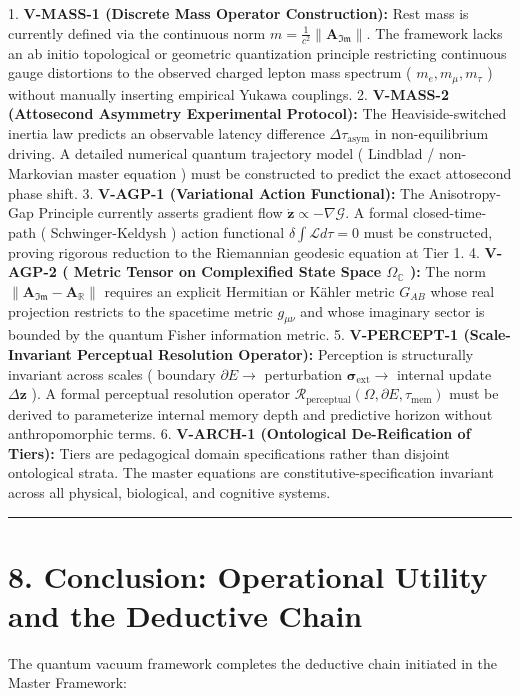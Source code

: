 \documentclass[11pt,a4paper]{article}
\theoremstyle{definition}\newtheorem{definition}{Definition}
\theoremstyle{remark}\newtheorem{remark}{Remark}
\begin{document}
1. \textbf{V-MASS-1 (Discrete Mass Operator Construction):} Rest mass is currently defined via the continuous norm $m = \frac{1}{c^2} \|\mathbf{A}_{\mathfrak{Im}}\|$. The framework lacks an ab initio topological or geometric quantization principle restricting continuous gauge distortions to the observed charged lepton mass spectrum ( $m_e, m_\mu, m_\tau$ ) without manually inserting empirical Yukawa couplings.
2. \textbf{V-MASS-2 (Attosecond Asymmetry Experimental Protocol):} The Heaviside-switched inertia law predicts an observable latency difference $\Delta \tau_{\text{asym}}$ in non-equilibrium driving. A detailed numerical quantum trajectory model ( Lindblad / non-Markovian master equation ) must be constructed to predict the exact attosecond phase shift.
3. \textbf{V-AGP-1 (Variational Action Functional):} The Anisotropy-Gap Principle currently asserts gradient flow $\dot{\mathbf{z}} \propto -\nabla\mathcal{G}$. A formal closed-time-path ( Schwinger-Keldysh ) action functional $\delta \int \mathcal{L} d\tau = 0$ must be constructed, proving rigorous reduction to the Riemannian geodesic equation at Tier 1.
4. \textbf{V-AGP-2 ( Metric Tensor on Complexified State Space $\Omega_{\mathbb{C}}$ ):} The norm $\|\mathbf{A}_{\mathfrak{Im}} - \mathbf{A}_{\mathbb{R}}\|$ requires an explicit Hermitian or Kähler metric $G_{AB}$ whose real projection restricts to the spacetime metric $g_{\mu\nu}$ and whose imaginary sector is bounded by the quantum Fisher information metric.
5. \textbf{V-PERCEPT-1 (Scale-Invariant Perceptual Resolution Operator):} Perception is structurally invariant across scales ( boundary $\partial E \to$ perturbation $\boldsymbol{\sigma}_{\text{ext}} \to$ internal update $\Delta \mathbf{z}$ ). A formal perceptual resolution operator $\mathcal{R}_{\text{perceptual}}(\Omega, \partial E, \tau_{\text{mem}})$ must be derived to parameterize internal memory depth and predictive horizon without anthropomorphic terms.
6. \textbf{V-ARCH-1 (Ontological De-Reification of Tiers):} Tiers are pedagogical domain specifications rather than disjoint ontological strata. The master equations are constitutive-specification invariant across all physical, biological, and cognitive systems.

\noindent\rule{\linewidth}{0.4pt}
\section{8. Conclusion: Operational Utility and the Deductive Chain}

The quantum vacuum framework completes the deductive chain initiated in the Master Framework:
\end{document}
